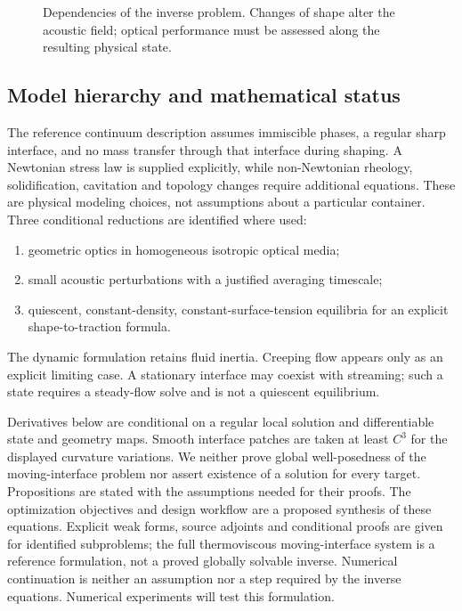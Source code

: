 \begin{figure}[htbp]
\centering
{}
\caption{Dependencies of the inverse problem. Changes of shape alter the acoustic
field; optical performance must be assessed along the resulting physical state.}
\label{fig:dependencies}
\end{figure}

\subsection{Model hierarchy and mathematical status}
The reference continuum description assumes immiscible phases, a regular sharp
interface, and no mass transfer through that interface during shaping. A
Newtonian stress law is supplied explicitly, while non-Newtonian rheology,
solidification, cavitation and topology changes require additional equations.
These are physical modeling choices, not assumptions about a particular
container. Three conditional reductions are identified where used:
\begin{enumerate}[label=(\roman*)]
\item geometric optics in homogeneous isotropic optical media;
\item small acoustic perturbations with a justified averaging timescale;
\item quiescent, constant-density, constant-surface-tension equilibria for an
explicit shape-to-traction formula.
\end{enumerate}
The dynamic formulation retains fluid inertia. Creeping flow appears only as an
explicit limiting case. A stationary interface may coexist with streaming;
such a state requires a steady-flow solve and is not a quiescent equilibrium.

Derivatives below are conditional on a regular local solution and differentiable
state and geometry maps. Smooth interface patches are taken at least $C^3$ for
the displayed curvature variations. We neither prove global well-posedness of
the moving-interface problem nor assert existence of a solution for every
target. Propositions are stated with the assumptions needed for their proofs.
The optimization objectives and design workflow are a proposed synthesis of
these equations. Explicit weak forms, source adjoints and conditional proofs
are given for identified subproblems; the full thermoviscous moving-interface
system is a reference formulation, not a proved globally solvable inverse.
Numerical continuation is neither an assumption nor a step required by the
inverse equations. Numerical experiments will test this formulation.

